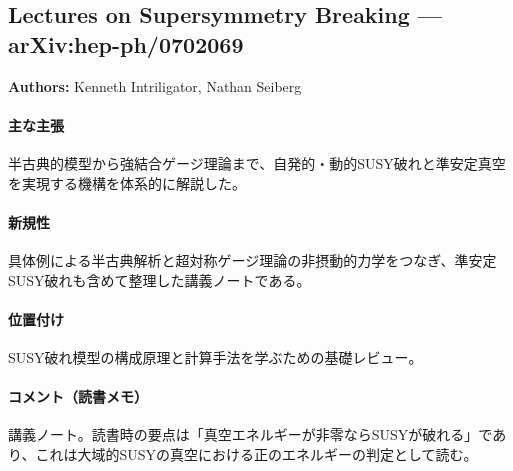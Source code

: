 \subsection{Lectures on Supersymmetry Breaking --- arXiv:hep-ph/0702069}

\textbf{Authors:} Kenneth Intriligator, Nathan Seiberg

\paragraph{主な主張}
半古典的模型から強結合ゲージ理論まで、自発的・動的SUSY破れと準安定真空を実現する機構を体系的に解説した\cite{Intriligator:2007cp}。

\paragraph{新規性}
具体例による半古典解析と超対称ゲージ理論の非摂動的力学をつなぎ、準安定SUSY破れも含めて整理した講義ノートである。

\paragraph{位置付け}
SUSY破れ模型の構成原理と計算手法を学ぶための基礎レビュー。

\paragraph{コメント（読書メモ）}
講義ノート。読書時の要点は「真空エネルギーが非零ならSUSYが破れる」であり、これは大域的SUSYの真空における正のエネルギーの判定として読む。

